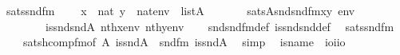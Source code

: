 \begin{isabellebody}
\isanewline
{}\isamarkupfalse%
\ sats{\isacharunderscore}{\kern0pt}snd{}{\isacharunderscore}{\kern0pt}fm\ {\isacharcolon}{\kern0pt}\isanewline
\ \ {\isachardoublequoteopen}{\isasymlbrakk}\ x\ {\isasymin}\ nat{\isacharsemicolon}{\kern0pt}\ y\ {\isasymin}\ nat{\isacharsemicolon}{\kern0pt}env\ {\isasymin}\ list{\isacharparenleft}{\kern0pt}A{\isacharparenright}{\kern0pt}\ {\isasymrbrakk}\ \isanewline
\ \ \ \ {\isasymLongrightarrow}\ sats{\isacharparenleft}{\kern0pt}A{\isacharcomma}{\kern0pt}snd{\isacharunderscore}{\kern0pt}snd{\isacharunderscore}{\kern0pt}fm{\isacharparenleft}{\kern0pt}x{\isacharcomma}{\kern0pt}y{\isacharparenright}{\kern0pt}{\isacharcomma}{\kern0pt}\ env{\isacharparenright}{\kern0pt}\ {\isasymlongleftrightarrow}\isanewline
\ \ \ \ \ \ \ \ is{\isacharunderscore}{\kern0pt}snd{\isacharunderscore}{\kern0pt}snd{\isacharparenleft}{\kern0pt}{\isacharhash}{\kern0pt}{\isacharhash}{\kern0pt}A{\isacharcomma}{\kern0pt}\ nth{\isacharparenleft}{\kern0pt}x{\isacharcomma}{\kern0pt}env{\isacharparenright}{\kern0pt}{\isacharcomma}{\kern0pt}\ nth{\isacharparenleft}{\kern0pt}y{\isacharcomma}{\kern0pt}env{\isacharparenright}{\kern0pt}{\isacharparenright}{\kern0pt}{\isachardoublequoteclose}\isanewline
%
\isadelimproof
\ \ %
\endisadelimproof
%
\isatagproof
{}\isamarkupfalse%
\ snd{\isacharunderscore}{\kern0pt}snd{\isacharunderscore}{\kern0pt}fm{\isacharunderscore}{\kern0pt}def\ is{\isacharunderscore}{\kern0pt}snd{\isacharunderscore}{\kern0pt}snd{\isacharunderscore}{\kern0pt}def\ \isamarkupfalse%
\ sats{\isacharunderscore}{\kern0pt}snd{\isacharunderscore}{\kern0pt}fm\ \isanewline
\ \ \ \ sats{\isacharunderscore}{\kern0pt}hcomp{\isacharunderscore}{\kern0pt}fm{\isacharbrackleft}{\kern0pt}of\ A\ {\isachardoublequoteopen}is{\isacharunderscore}{\kern0pt}snd{\isacharparenleft}{\kern0pt}{\isacharhash}{\kern0pt}{\isacharhash}{\kern0pt}A{\isacharparenright}{\kern0pt}{\isachardoublequoteclose}\ {\isacharunderscore}{\kern0pt}\ snd{\isacharunderscore}{\kern0pt}fm\ {\isachardoublequoteopen}is{\isacharunderscore}{\kern0pt}snd{\isacharparenleft}{\kern0pt}{\isacharhash}{\kern0pt}{\isacharhash}{\kern0pt}A{\isacharparenright}{\kern0pt}{\isachardoublequoteclose}{\isacharbrackright}{\kern0pt}\ \isamarkupfalse%
\ simp%
\endisatagproof
{\isafoldproof}%
%
\isadelimproof
\isanewline
%
\endisadelimproof
\isanewline
{}\isamarkupfalse%
\isanewline
\ \ is{\isacharunderscore}{\kern0pt}name{}\ {\isacharcolon}{\kern0pt}{\isacharcolon}{\kern0pt}\ {\isachardoublequoteopen}{\isacharparenleft}{\kern0pt}i{\isasymRightarrow}o{\isacharparenright}{\kern0pt}{\isasymRightarrow}i{\isasymRightarrow}i{\isasymRightarrow}o{\isachardoublequoteclose}\ \isanewline

\end{isabellebody}
